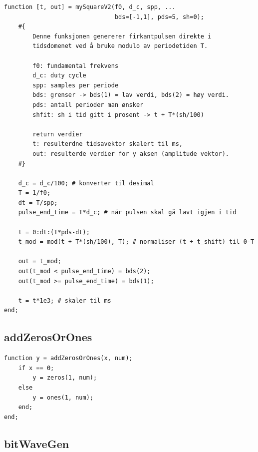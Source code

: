 \begin{verbatim}
function [t, out] = mySquareV2(f0, d_c, spp, ...
                               bds=[-1,1], pds=5, sh=0);
    #{
        Denne funksjonen genererer firkantpulsen direkte i
        tidsdomenet ved å bruke modulo av periodetiden T.

        f0: fundamental frekvens
        d_c: duty cycle
        spp: samples per periode
        bds: grenser -> bds(1) = lav verdi, bds(2) = høy verdi.
        pds: antall perioder man ønsker
        shfit: sh i tid gitt i prosent -> t + T*(sh/100)

        return verdier
        t: resulterdne tidsavektor skalert til ms,
        out: resulterde verdier for y aksen (amplitude vektor).
    #}

    d_c = d_c/100; # konverter til desimal
    T = 1/f0; 
    dt = T/spp;
    pulse_end_time = T*d_c; # når pulsen skal gå lavt igjen i tid 

    t = 0:dt:(T*pds-dt);
    t_mod = mod(t + T*(sh/100), T); # normaliser (t + t_shift) til 0-T 

    out = t_mod;
    out(t_mod < pulse_end_time) = bds(2);
    out(t_mod >= pulse_end_time) = bds(1);

    t = t*1e3; # skaler til ms
end;
\end{verbatim}

\subsection*{addZerosOrOnes}

\begin{verbatim}
function y = addZerosOrOnes(x, num);
    if x == 0;
        y = zeros(1, num);
    else
        y = ones(1, num);
    end;
end;
\end{verbatim}


\subsection*{bitWaveGen}

